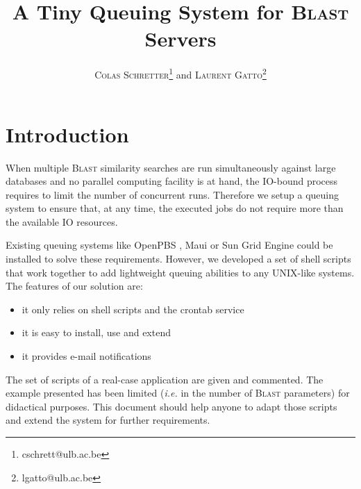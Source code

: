 \documentclass[USenglish]{scrartcl}
\newcommand{\noun}[1]{\textsc{#1}}
\begin{document}
\title{A Tiny Queuing System for \noun{Blast} Servers}


\author{\noun{Colas Schretter}\footnote{cschrett@ulb.ac.be} and \noun{Laurent Gatto}\footnote{lgatto@ulb.ac.be}}

\maketitle


\doublespacing

\section*{Introduction}

When multiple \noun{Blast} \cite{blast} similarity searches are run simultaneously against large databases and no parallel computing facility is at hand, the IO-bound process requires to limit the number of concurrent runs. Therefore we setup a queuing system to ensure that, at any time, the executed jobs do not require more than the available IO resources.

Existing queuing systems like OpenPBS \cite{opbs}, Maui \cite{maui} or Sun Grid Engine \cite{sge} could be installed to solve these requirements. However, we developed a set of shell scripts that work together to add lightweight queuing abilities to any \noun{UNIX}-like systems. The features of our solution are:

\begin{itemize}
	\item it only relies on shell scripts and the crontab service
	\item it is easy to install, use and extend
	\item it provides e-mail notifications
\end{itemize}

The set of scripts of a real-case application are given and commented. The example presented has been limited (\textit{i.e.} in the number of \noun{Blast} parameters) for didactical purposes. This document should help anyone to adapt those scripts and extend the system for further requirements.

\end{document}

